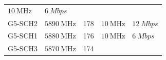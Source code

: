 \documentclass[letterpaper,11pt,ngerman]{article}
\begin{document}
\begin{onehalfspace}
\begin{longtable}[]{@{}lllll@{}}
\begin{minipage}[t]{0.14\columnwidth}
\(\SI{10}{\mega\hertz}\)\strut
\end{minipage} & \begin{minipage}[t]{0.18\columnwidth}\raggedright\strut
\(\SI{6}{Mbps}\)\strut
\end{minipage}\tabularnewline
\begin{minipage}[t]{0.08\columnwidth}\raggedright\strut
G5-SCH2\strut
\end{minipage} & \begin{minipage}[t]{0.30\columnwidth}\raggedright\strut
\(\SI{5890}{\mega\hertz}\)\strut
\end{minipage} & \begin{minipage}[t]{0.16\columnwidth}\raggedright\strut
178\strut
\end{minipage} & \begin{minipage}[t]{0.14\columnwidth}\raggedright\strut
\(\SI{10}{\mega\hertz}\)\strut
\end{minipage} & \begin{minipage}[t]{0.18\columnwidth}\raggedright\strut
\(\SI{12}{Mbps}\)\strut
\end{minipage}\tabularnewline
\begin{minipage}[t]{0.08\columnwidth}\raggedright\strut
G5-SCH1\strut
\end{minipage} & \begin{minipage}[t]{0.30\columnwidth}\raggedright\strut
\(\SI{5880}{\mega\hertz}\)\strut
\end{minipage} & \begin{minipage}[t]{0.16\columnwidth}\raggedright\strut
176\strut
\end{minipage} & \begin{minipage}[t]{0.14\columnwidth}\raggedright\strut
\(\SI{10}{\mega\hertz}\)\strut
\end{minipage} & \begin{minipage}[t]{0.18\columnwidth}\raggedright\strut
\(\SI{6}{Mbps}\)\strut
\end{minipage}\tabularnewline
\begin{minipage}[t]{0.08\columnwidth}\raggedright\strut
G5-SCH3\strut
\end{minipage} & \begin{minipage}[t]{0.30\columnwidth}\raggedright\strut
\(\SI{5870}{\mega\hertz}\)\strut
\end{minipage} & \begin{minipage}[t]{0.16\columnwidth}\raggedright\strut
174\strut
\end{minipage} & \begin{minipage}[t]{0.14\columnwidth}\raggedright\strut

\end{minipage}
\end{longtable}
\end{onehalfspace}
\end{document}
